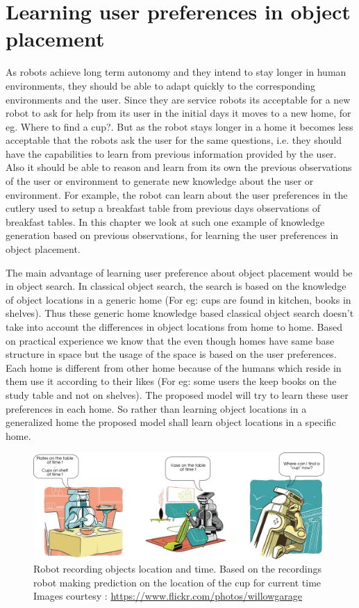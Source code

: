 \chapter{Learning user preferences in object placement}


As robots achieve long term autonomy and they intend to stay longer in human environments, they should be able to adapt quickly to the corresponding environments and the user. Since they are service robots its acceptable for a new robot to ask for help from its user in the initial days it moves to a new home, for eg. Where to find a cup?. But as the robot stays longer in a home it becomes less acceptable that the robots ask the user for the same questions, i.e. they should have the capabilities to learn from previous information provided by the user. Also it should be able to reason and learn from its own the previous observations of the user or environment to generate new knowledge about the user or environment. For example, the robot can learn about the user preferences in the cutlery used to setup a breakfast table from previous days observations of breakfast tables. In this chapter we look at such one example of knowledge generation based on previous observations, for learning the user preferences in object placement.

The main advantage of learning user preference about object placement would be in object search. In classical object search, the search is based on the knowledge of object locations in a generic home (For eg: cups are found in kitchen, books in shelves). Thus these generic home knowledge based classical object search doesn't take into account the differences in object locations from home to home. Based on practical experience we know that the even though homes have same base structure in space but the usage of the space is based on the user preferences. Each home is different from other home because of the humans which reside in them use it according to their likes (For eg: some users the keep books on the study table and not on shelves). The proposed model will try to learn these user preferences in each home. So rather than learning object locations in a generalized home the proposed model shall learn object locations in a specific home.


\begin{figure}[htp]
\centering
\includegraphics[scale=0.4]{pictures/scenario.png}
\caption[Example scenario of robot recording objects location and time]{Robot recording objects location and time. Based on the
recordings robot making prediction on the location of the cup for current time
Images courtesy : \url{https://www.flickr.com/photos/willowgarage} }
\label{scenario}
\end{figure}

